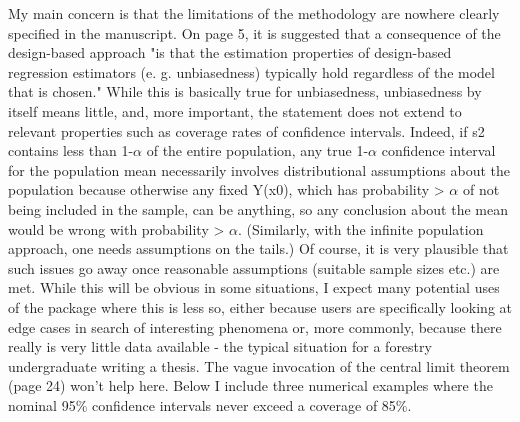 \documentclass{article}
\begin{document}
My main concern is that the limitations of the methodology are nowhere clearly specified in the manuscript. On page 5, it is suggested that a consequence of the design-based approach "is that the estimation properties of design-based regression estimators (e. g. unbiasedness) typically hold regardless of the model that is chosen." While this is basically true for unbiasedness, unbiasedness by itself means little, and, more important, the statement does not extend to relevant properties such as coverage rates of confidence intervals. Indeed, if s2 contains less than 1-$\alpha$ of the entire population, any true 1-$\alpha$ confidence interval for the population mean necessarily involves distributional assumptions about the population because otherwise any fixed Y(x0), which has probability > $\alpha$ of not being included in the sample, can be anything, so any conclusion about the mean would be wrong with probability > $\alpha$. (Similarly, with the infinite population approach, one needs assumptions on the tails.) Of course, it is very plausible that such issues go away once reasonable assumptions (suitable sample sizes etc.) are met. While this will be obvious in some situations, I expect many potential uses of the package where this is less so, either because users are specifically looking at edge cases in search of interesting phenomena or, more commonly, because there really is very little data available - the typical situation for a forestry undergraduate writing a thesis. The vague invocation of the central limit theorem (page 24) won't help here. Below I include three numerical examples where the nominal 95\% confidence intervals never exceed a coverage of 85\%.\\

\\
\end{document}
